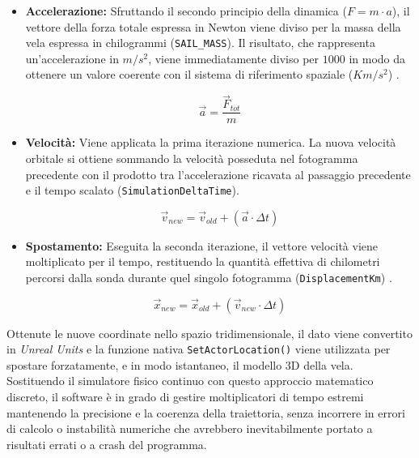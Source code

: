 \begin{itemize}
    \item \textbf{Accelerazione:} Sfruttando il secondo principio della dinamica ($F = m \cdot a$), il vettore della forza totale espressa in Newton viene diviso per la massa della vela espressa in chilogrammi (\lstinline|SAIL_MASS|). Il risultato, che rappresenta un'accelerazione in $m/s^2$, viene immediatamente diviso per $1000$ in modo da ottenere un valore coerente con il sistema di riferimento spaziale ($Km/s^2$) \cite{curtis2005orbital}.
    
    \begin{equation}
        \vec{a} = \frac{\vec{F}_{tot}}{m}
    \end{equation}
    
    \item \textbf{Velocità:} Viene applicata la prima iterazione numerica. La nuova velocità orbitale si ottiene sommando la velocità posseduta nel fotogramma precedente con il prodotto tra l'accelerazione ricavata al passaggio precedente e il tempo scalato (\lstinline|SimulationDeltaTime|).
    
    \begin{equation}
        \vec{v}_{new} = \vec{v}_{old} + (\vec{a} \cdot \Delta t)
    \end{equation}
    
    \item \textbf{Spostamento:} Eseguita la seconda iterazione, il vettore velocità viene moltiplicato per il tempo, restituendo la quantità effettiva di chilometri percorsi dalla sonda durante quel singolo fotogramma (\lstinline|DisplacementKm|) \cite{simo2016realistic}.
    
    \begin{equation}
        \vec{x}_{new} = \vec{x}_{old} + (\vec{v}_{new} \cdot \Delta t)
    \end{equation}
\end{itemize}

Ottenute le nuove coordinate nello spazio tridimensionale, il dato viene convertito in \textit{Unreal Units} e la funzione nativa \lstinline|SetActorLocation()| viene utilizzata per spostare forzatamente, e in modo istantaneo, il modello 3D della vela. 
Sostituendo il simulatore fisico continuo con questo approccio matematico discreto, il software è in grado di gestire moltiplicatori di tempo estremi mantenendo la precisione e la coerenza della traiettoria, senza incorrere in errori di calcolo o instabilità numeriche che avrebbero inevitabilmente portato a risultati errati o a crash del programma.

